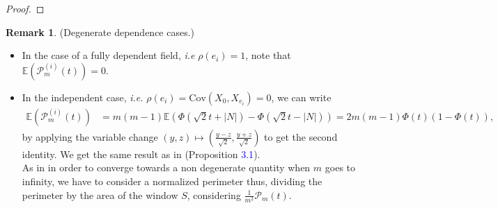 \documentclass[12pt]{article}
\theoremstyle{Theorem}
\theoremstyle{definition}
\newtheorem{remark}{Remark}
\begin{document}
\begin{proof}
\end{proof}
\begin{remark}(Degenerate dependence cases.)
\begin{itemize}
\item In the case of a fully dependent field, \textit{i.e}  $\rho(e_i) = 1$, note that $\mathbb{E}\left(\mathcal{P}_{m}^{\scriptscriptstyle (i)}(t) \right) = 0$.
\item In the independent case, \textit{i.e.} $\rho(e_{i}) = \text{Cov}\left(X_{0}, X_{e_i}\right) = 0$, we can write
{\small
\begin{align*}
\mathbb{E}\left(\mathcal{P}^{\scriptscriptstyle  (i)}_{m}(t) \right) & = m(m-1)\mathbb{E}\left(\Phi\left(\sqrt{2}t + |N|\right) - \Phi\left(\sqrt{2}t - |N|\right)\right) = 2m(m-1)\Phi(t)\left(1-\Phi(t)\right), 
\end{align*}}by applying the variable change $ (y, z) \mapsto (\frac{y-z}{\sqrt{2}}, \frac{y+z}{\sqrt{2}})$ to get the second identity. We get the same result as in \cite{Psymetrie} (Proposition \textcolor{blue}{3.1}). \\ As in \cite{Psymetrie} in order to converge towards a non degenerate quantity when $m$ goes to infinity, we have to consider a normalized perimeter thus, dividing the perimeter by the area of the window $S$, considering $\frac{1}{m^2}\mathcal{P}_{m}(t)$.
\end{itemize}
\end{remark}
\end{document}
